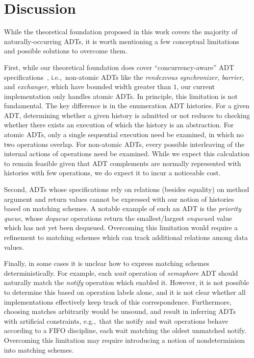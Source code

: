 \section{Discussion}
\label{sec:discussion}

While the theoretical foundation proposed in this work covers the majority of
naturally-occurring ADTs, it is worth mentioning a few conceptual limitations
and possible solutions to overcome them.

First, while our theoretical foundation does cover “concurrency-aware” ADT
specifications~\cite{conf/podc/HemedR14}, i.e.,~non-atomic ADTs like the
\emph{rendezvous synchronizer}, \emph{barrier}, and \emph{exchanger}, which
have bounded width greater than $1$, our current implementation only
handles atomic ADTs. In principle, this limitation is not fundamental. The key
difference is in the enumeration ADT histories. For a given ADT,
determining whether a given history is admitted or not reduces
to checking whether there exists an execution of which the history is an
abstraction. For atomic ADTs, only a single sequential execution need be
examined, in which no two operations overlap. For non-atomic ADTs, every
possible interleaving of the internal actions of operations need be examined.
While we expect this calculation to remain feasible given that ADT complements
are normally represented with histories with few operations, we do expect it to
incur a noticeable cost.

Second, ADTs whose specifications rely on relations (besides equality) on
method argument and return values cannot be expressed with our notion of
histories based on matching schemes. A notable example of such an ADT is the
\emph{priority queue}, whose \emph{dequeue} operations return the
smallest/largest \emph{enqueue}d value which has not yet been dequeued.
Overcoming this limitation would
require a refinement to matching schemes which can track additional relations
among data values.

Finally, in some cases it is unclear how to express matching schemes
deterministically. For example, each \emph{wait} operation of \emph{semaphore}
ADT should naturally match the \emph{notify} operation which enabled it.
However, it is not possible to determine this based on operation labels alone,
and it is not clear whether all implementations effectively keep track of this
correspondence. Furthermore, choosing matches arbitrarily would be unsound, and
result in inferring ADTs with artificial constraints, e.g.,~that the notify and
wait operations behave according to a FIFO discipline, each wait matching the
oldest unmatched notify. Overcoming this limitation may require introducing a
notion of nondeterminism into matching schemes.
